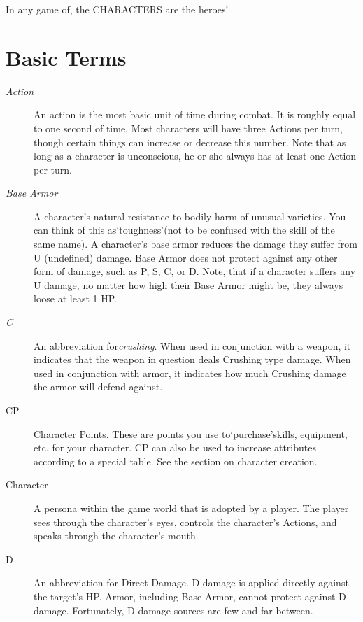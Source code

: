 \documentclass[twoside]{book}
\begin{document}
    {  
    In any game of\APATHY{}, the CHARACTERS are the heroes!
    }
  
    

\section{Basic Terms}
    
\begin{description}
    
  \item[\emph{Action}] 
    {  
    An action is the most basic unit of time during combat. It is roughly equal to one second of time. Most characters will have three Actions per turn, though certain things can increase or decrease this number. Note that as long as a character is unconscious, he or she always has at least one Action per turn.
    }
  
  \item[\emph{Base Armor}] 
    {  
    A character's natural resistance to bodily harm of unusual varieties. You can think of this as`toughness'(not to be confused with the skill of the same name). A character's base armor reduces the damage they suffer from U (undefined) damage. Base Armor does not protect against any other form of damage, such as P, S, C, or D. Note, that if a character suffers any U damage, no matter how high their Base Armor might be, they always loose at least 1 HP.
    }
  
  \item[\emph{C}] 
    {  
    An abbreviation for\emph{crushing}. When used in conjunction with a weapon, it indicates that the weapon in question deals Crushing type damage. When used in conjunction with armor, it indicates how much Crushing damage the armor will defend against.
    }
  
  \item[CP] 
    {  
    Character Points. These are points you use to`purchase'skills, equipment, etc. for your character. CP can also be used to increase attributes according to a special table. See the section on character creation.
    }
  
  \item[Character] 
    {  
    A persona within the game world that is adopted by a player. The player sees through the character's eyes, controls the character's Actions, and speaks through the character's mouth.
    }
  
  \item[D] 
    {  
    An abbreviation for Direct Damage. D damage is applied directly against the target's HP. Armor, including Base Armor, cannot protect against D damage. Fortunately, D damage sources are few and far between.
    }
  

\end{description}
\end{document}
